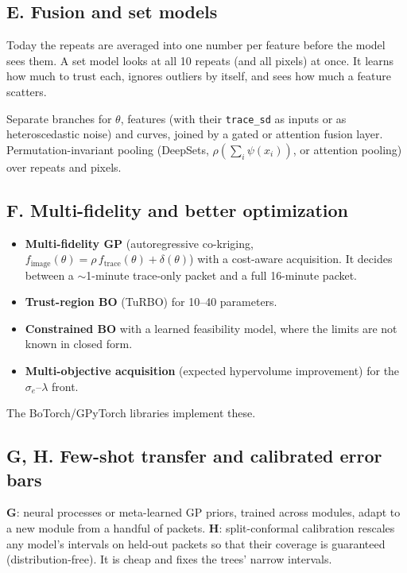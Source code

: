 \documentclass[10pt]{article}
\newcommand{\code}[1]{\texttt{#1}}
\begin{document}
\subsection*{E. Fusion and set models}
\begin{basic}
Today the repeats are averaged into one number per feature before the model sees them. A set model looks at all 10 repeats (and all
pixels) at once. It learns how much to trust each, ignores outliers by itself, and sees how much a feature scatters.
\end{basic}
\begin{advanced}
Separate branches for $\theta$, features (with their \code{trace\_sd} as inputs or as heteroscedastic noise) and curves, joined by a
gated or attention fusion layer. Permutation-invariant pooling (DeepSets, $\rho(\sum_i \psi(x_i))$, or attention pooling) over repeats
and pixels.
\end{advanced}

\subsection*{F. Multi-fidelity and better optimization}
\begin{advanced}
\begin{itemize}
\item \textbf{Multi-fidelity GP} (autoregressive co-kriging, $f_\text{image}(\theta) = \rho\,f_\text{trace}(\theta) + \delta(\theta)$) with a
  cost-aware acquisition. It decides between a $\sim$1-minute trace-only packet and a full 16-minute packet.
\item \textbf{Trust-region BO} (TuRBO) for 10--40 parameters.
\item \textbf{Constrained BO} with a learned feasibility model, where the limits are not known in closed form.
\item \textbf{Multi-objective acquisition} (expected hypervolume improvement) for the $\sigma_e$--$\lambda$ front.
\end{itemize}
The BoTorch/GPyTorch libraries implement these.
\end{advanced}

\subsection*{G, H. Few-shot transfer and calibrated error bars}
\begin{advanced}
\textbf{G}: neural processes or meta-learned GP priors, trained across modules, adapt to a new module from a handful of packets.
\textbf{H}: split-conformal calibration rescales any model's intervals on held-out packets so that their coverage is guaranteed
(distribution-free). It is cheap and fixes the trees' narrow intervals.
\end{advanced}
\end{document}

